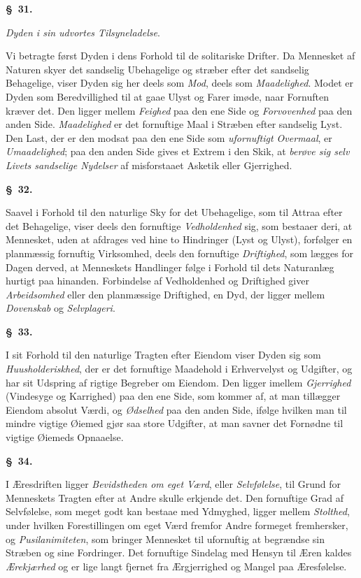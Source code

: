 \documentclass[12pt]{article}
\newcommand{\opage}[1]{\marginnote{\footnotesize\textit{[#1]}}}
\newcommand{\slaw}[1]{\par\medskip\begin{center}\textbf{\S~#1.}\end{center}\nopagebreak}
\newcommand{\anm}[1]{\par\smallskip{\small\hangindent=1.6em\hangafter=0\textit{Anm.}\quad #1\par}\smallskip}
\begin{document}
\anm{Om \emph{moralsk Svaghed og Slethed}.}

\slaw{31}
\begin{center}\emph{Dyden i sin udvortes Tilsyneladelse}.\end{center}
\opage{156}Vi betragte først Dyden i dens Forhold til de solitariske Drifter. Da Mennesket af Naturen skyer det sandselig Ubehagelige og stræber efter det sandselig Behagelige, viser Dyden sig her deels som \emph{Mod}, deels som \emph{Maadelighed}. Modet er Dyden som Beredvillighed til at gaae Ulyst og Farer imøde, naar Fornuften kræver det. Den ligger mellem \emph{Feighed} paa den ene Side og \emph{Forvovenhed} paa den anden Side. \emph{Maadelighed} er det fornuftige Maal i Stræben efter sandselig Lyst. Den Last, der er den modsat paa den ene Side som \emph{ufornuftigt Overmaal}, er \emph{Umaadelighed}; paa den anden Side gives et Extrem i den Skik, at \emph{berøve sig selv Livets sandselige Nydelser} af misforstaaet Asketik eller Gjerrighed.

\slaw{32}
Saavel i Forhold til den naturlige Sky for det Ubehagelige, som til Attraa efter det Behagelige, viser deels den fornuftige \emph{Vedholdenhed} sig, som bestaaer deri, at Mennesket, uden at afdrages ved hine to Hindringer (Lyst og Ulyst), forfølger en planmæssig fornuftig Virksomhed, deels den fornuftige \emph{Driftighed}, som lægges for Dagen derved, at Menneskets Handlinger følge i Forhold til dets Naturanlæg hurtigt paa hinanden. Forbindelse af Vedholdenhed og Driftighed giver \emph{Arbeidsomhed} eller den planmæssige Driftighed, en Dyd, der ligger mellem \emph{Dovenskab} og \emph{Selvplageri}.

\slaw{33}
I sit Forhold til den naturlige Tragten efter Eiendom viser Dyden sig som \emph{Huusholderiskhed}, der er det fornuftige Maadehold i Erhvervelyst og Udgifter, og har sit Udspring af rigtige Begreber om Eiendom. Den ligger imellem \emph{Gjerrighed} (Vindesyge og Karrighed) paa den ene Side, som kommer af, at man tillægger Eiendom absolut Værdi, og \emph{Ødselhed} paa den anden \opage{157}Side, ifølge hvilken man til mindre vigtige Øiemed gjør saa store Udgifter, at man savner det Fornødne til vigtige Øiemeds Opnaaelse.

\slaw{34}
I Æresdriften ligger \emph{Bevidstheden om eget Værd}, eller \emph{Selvfølelse}, til Grund for Menneskets Tragten efter at Andre skulle erkjende det. Den fornuftige Grad af Selvfølelse, som meget godt kan bestaae med Ydmyghed, ligger mellem \emph{Stolthed}, under hvilken Forestillingen om eget Værd fremfor Andre formeget fremhersker, og \emph{Pusilanimiteten}, som bringer Mennesket til ufornuftig at begrændse sin Stræben og sine Fordringer. Det fornuftige Sindelag med Hensyn til Æren kaldes \emph{Ærekjærhed} og er lige langt fjernet fra Ærgjerrighed og Mangel paa Æresfølelse.
\end{document}
